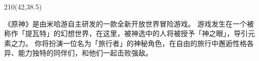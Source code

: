 \newpage
{}


\begin{textblock}{210}(42,38.5)
    \bfseries
\end{textblock}

\begin{requirementtext}
    \par 《原神》是由米哈游自主研发的一款全新开放世界冒险游戏。
    游戏发生在一个被称作「提瓦特」的幻想世界，在这里，被神选中的人将被授予「神之眼」，导引元素之力。
    你将扮演一位名为「旅行者」的神秘角色，在自由的旅行中邂逅性格各异、能力独特的同伴们，和他们一起击败强敌。
\end{requirementtext}

\null\clearpage